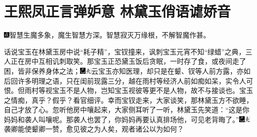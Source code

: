 

\chapter{王熙凤正言弹妒意 林黛玉俏语谑娇音}

{\includegraphics[width=3mm]{../Images/00005}智慧生魔多象，魔生智慧方深。智慧寂灭万缘根，不解智魔作甚。}

话说宝玉在林黛玉房中说``耗子精''，宝钗撞来，讽刺宝玉元宵不知``绿蜡''之典，三人正在房中互相讥刺取笑。那宝玉正恐黛玉饭后贪眠，一时存了食，或夜间走了困，皆非保养身体之法；{\includegraphics[width=3mm]{../Images/00003}\includegraphics[width=3mm]{../Images/00012}\footnotesize \kaishu 云宝玉亦知医理，却只是在颦、钗等人前方露，亦如后回许多明理之语，只在闺前现露三分，越在雨村等经济人前如痴如呆，实令人可恨。但雨村等视宝玉不是人物，岂知宝玉视彼等更不是人物，故不与接谈也。宝玉之情痴，真乎？假乎？看官细评。}幸而宝钗走来，大家谈笑，那林黛玉方不欲睡，自己才放了心。忽听他房中嚷起来，大家侧耳听了一听，林黛玉先笑道：``这是你妈妈和袭人叫嚷呢。那袭人也罢了，你妈妈再要认真排场他，可见老背晦了。''{\includegraphics[width=3mm]{../Images/00003}\includegraphics[width=3mm]{../Images/00012}\footnotesize \kaishu 袭卿能使颦卿一赞，愈见彼之为人矣，观者诸公以为如何？}

